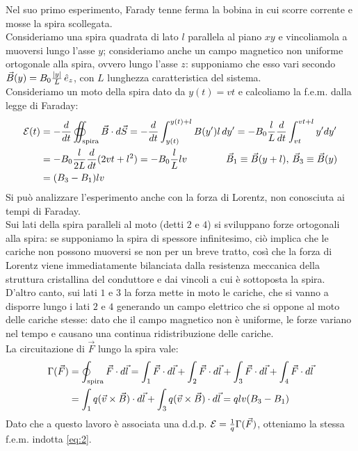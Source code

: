 Nel suo primo esperimento, Farady tenne ferma la bobina in cui scorre corrente e mosse la spira scollegata. \\ 
%
Consideriamo una spira quadrata di lato $ l $ parallela al piano $ xy $ e vincoliamola a muoversi lungo l'asse $ y $; consideriamo anche un campo magnetico non uniforme ortogonale alla spira, ovvero lungo l'asse $ z $: supponiamo che esso vari secondo $ \vec{B}(y) = B_0 \frac{\left\lvert y\right\rvert}{L} \,\hat{e}_z $, con $ L $ lunghezza caratteristica del sistema. \\ 
%
Consideriamo un moto della spira dato da $ y(t) = vt $ e calcoliamo la f.e.m. dalla legge di Faraday:
\begin{equation}
	\begin{split}
		\mathcal{E}(t) &= -\frac{d}{dt} \oiint_{\text{spira}} \vec{B}\cdot d\vec{S} = -\frac{d}{dt} \int_{y(t)}^{y(t)+l} B(y')l\,dy' = -B_0 \frac{l}{L} \frac{d}{dt} \int_{vt}^{vt+l} y'dy' \\ 
		      &= -B_0 \frac{l}{2L} \frac{d}{dt} (2vt + l^2) = - B_0 \frac{l}{L} lv \qquad\qquad \vec{B}_1 \equiv \vec{B}(y + l), \, \vec{B}_3 \equiv \vec{B}(y) \\ 
		      &= (B_3 - B_1) lv
	\end{split}
	\label{eq:2}
\end{equation}
Si può analizzare l'esperimento anche con la forza di Lorentz, non conosciuta ai tempi di Faraday. \\ 
%
Sui lati della spira paralleli al moto (detti $ 2 $ e $ 4 $) si sviluppano forze ortogonali alla spira: se supponiamo la spira di spessore infinitesimo, ciò implica che le cariche non possono muoversi se non per un breve tratto, così che la forza di Lorentz viene immediatamente bilanciata dalla resistenza meccanica della struttura cristallina del conduttore e dai vincoli a cui è sottoposta la spira. D'altro canto, sui lati $ 1 $ e $ 3 $ la forza mette in moto le cariche, che si vanno a disporre lungo i lati $ 2 $ e $ 4 $ generando un campo elettrico che si oppone al moto delle cariche stesse: dato che il campo magnetico non è uniforme, le forze variano nel tempo e causano una continua ridistribuzione delle cariche. \\ 
%
La circuitazione di $ \vec{F} $ lungo la spira vale:
\begin{equation}
	\begin{split}
		\Gamma(\vec{F}) &= \oint_{\text{spira}} \vec{F}\cdot d\vec{l} = \int_1 \vec{F}\cdot d\vec{l} + \int_2 \vec{F}\cdot d\vec{l} + \int_3 \vec{F}\cdot d\vec{l} + \int_4 \vec{F}\cdot d\vec{l} \\ 
				&= \int_1 q (\vec{v}\times\vec{B})\cdot d\vec{l} + \int_3 q (\vec{v}\times\vec{B})\cdot d\vec{l} = qlv(B_3 - B_1)
	\end{split}
	\label{eq:3}
\end{equation}
Dato che a questo lavoro è associata una d.d.p. $ \mathcal{E} = \frac{1}{q} \Gamma(\vec{F}) $, otteniamo la stessa f.e.m. indotta \ref{eq:2}.


